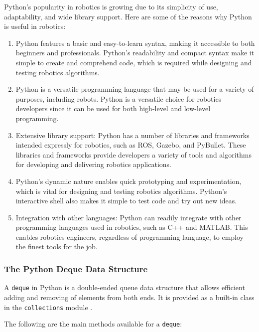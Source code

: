 \documentclass[12pt,oneside]{article}
\begin{document}
Python's popularity in robotics is growing due to its simplicity of use, adaptability, and wide library support. Here are some of the reasons why Python is useful in robotics:
\begin{enumerate}
\item Python features a basic and easy-to-learn syntax, making it accessible to both beginners and professionals. Python's readability and compact syntax make it simple to create and comprehend code, which is required while designing and testing robotics algorithms.
\item Python is a versatile programming language that may be used for a variety of purposes, including robots. Python is a versatile choice for robotics developers since it can be used for both high-level and low-level programming.
\item Extensive library support: Python has a number of libraries and frameworks intended expressly for robotics, such as ROS, Gazebo, and PyBullet. These libraries and frameworks provide developers a variety of tools and algorithms for developing and delivering robotics applications.
\item Python's dynamic nature enables quick prototyping and experimentation, which is vital for designing and testing robotics algorithms. Python's interactive shell also makes it simple to test code and try out new ideas.
\item Integration with other languages: Python can readily integrate with other programming languages used in robotics, such as C++ and MATLAB. This enables robotics engineers, regardless of programming language, to employ the finest tools for the job.
\end{enumerate}

\subsubsection{The Python Deque Data Structure}{\label{python:deque}}
A \texttt{deque} in Python is a double-ended queue data structure that allows efficient adding and removing of elements from both ends. It is provided as a built-in class in the \texttt{collections} module \cite{python-docs}.

The following are the main methods available for a \texttt{deque}:
\end{document}
